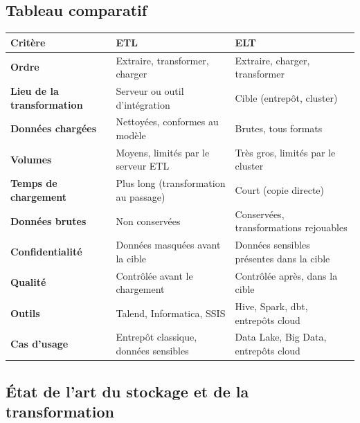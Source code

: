 \subsection{Tableau comparatif}

\begin{center}
\begin{tabularx}{\textwidth}{>{\bfseries}l >{\raggedright\arraybackslash}X >{\raggedright\arraybackslash}X}
\toprule
Critère & ETL & ELT \\
\midrule
Ordre & Extraire, transformer, charger & Extraire, charger, transformer \\
Lieu de la transformation & Serveur ou outil d'intégration & Cible (entrepôt, cluster) \\
Données chargées & Nettoyées, conformes au modèle & Brutes, tous formats \\
Volumes & Moyens, limités par le serveur ETL & Très gros, limités par le cluster \\
Temps de chargement & Plus long (transformation au passage) & Court (copie directe) \\
Données brutes & Non conservées & Conservées, transformations rejouables \\
Confidentialité & Données masquées avant la cible & Données sensibles présentes dans la cible \\
Qualité & Contrôlée avant le chargement & Contrôlée après, dans la cible \\
Outils & Talend, Informatica, SSIS & Hive, Spark, dbt, entrepôts cloud \\
Cas d'usage & Entrepôt classique, données sensibles & Data Lake, Big Data, entrepôts cloud \\
\bottomrule
\end{tabularx}
\end{center}

\subsection{État de l'art du stockage et de la transformation}

